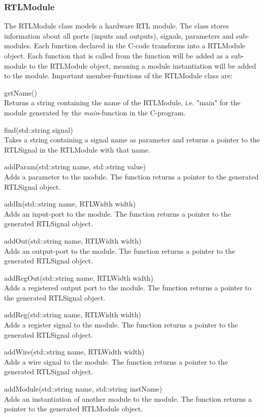 \subsubsection{RTLModule}
The RTLModule class models a hardware RTL module. The class stores information about all ports (inputs and outputs), signals, parameters and sub-modules. Each function declared in the C-code transforms into a RTLModule object. Each function that is called from the function will be added as a sub-module to the RTLModule object, meaning a module instantiation will be added to the module. Important member-functions of the RTLModule class are:
\begin{compactdesc}
    \item[getName()] \hfill \\
    Returns a string containing the name of the RTLModule, i.e. "main" for the module generated by the \textit{main}-function in the C-program.
    \item[find(std::string signal)] \hfill \\
    Takes a string containing a signal name as parameter and returns a pointer to the RTLSignal in the RTLModule with that name.
    \item[addParam(std::string name, std::string value)] \hfill \\
    Adds a parameter to the module. The function returns a pointer to the generated RTLSignal object.
    \item[addIn(std::string name, RTLWidth width)] \hfill \\
    Adds an input-port to the module. The function returns a pointer to the generated RTLSignal object.
    \item[addOut(std::string name, RTLWidth width)] \hfill \\
    Adds an output-port to the module. The function returns a pointer to the generated RTLSignal object.
    \item[addRegOut(std::string name, RTLWidth width)] \hfill \\
    Adds a registered output port to the module. The function returns a pointer to the generated RTLSignal object.
    \item[addReg(std::string name, RTLWidth width)] \hfill \\
    Adds a register signal to the module. The function returns a pointer to the generated RTLSignal object.
    \item[addWire(std::string name, RTLWidth width)] \hfill \\
    Adds a wire signal to the module. The function returns a pointer to the generated RTLSignal object.
    \item[addModule(std::string name, std::string instName)] \hfill \\
    Adds an instantiation of another module to the module. The function returns a pointer to the generated RTLModule
    object.
\end{compactdesc}
